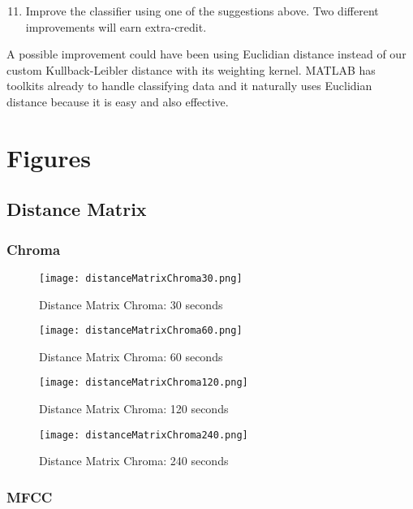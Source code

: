\documentclass{article} %
\begin{document}
\begin{framed}
\begin{enumerate}
\setcounter{enumi}{10}
\item Improve the classifier using one of the suggestions above. Two different improvements will earn extra-credit.
\end{enumerate}
\end{framed}

A possible improvement could have been using Euclidian distance instead of our custom Kullback-Leibler distance with its weighting kernel. MATLAB has toolkits already to handle
classifying data and it naturally uses Euclidian distance because it is easy and also effective. 

\clearpage
\appendix
\section{Figures}

\subsection{Distance Matrix}
\subsubsection{Chroma}


\begin{figure}[H]
\centering
\texttt{[image: distanceMatrixChroma30.png]}
\caption{Distance Matrix Chroma: 30 seconds}
\end{figure}

\begin{figure}[H]
\centering
\texttt{[image: distanceMatrixChroma60.png]}
\caption{Distance Matrix Chroma: 60 seconds}
\end{figure}

\begin{figure}[H]
\centering
\texttt{[image: distanceMatrixChroma120.png]}
\caption{Distance Matrix Chroma: 120 seconds}
\end{figure}

\begin{figure}[H]
\centering
\texttt{[image: distanceMatrixChroma240.png]}
\caption{Distance Matrix Chroma: 240 seconds}
\end{figure}


\subsubsection{MFCC}
\end{document}
